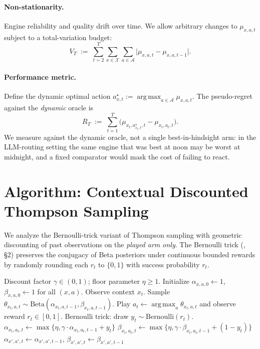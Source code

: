 \documentclass[11pt]{article}
\theoremstyle{definition}
\newcommand{\Beta}{\mathrm{Beta}}
\newcommand{\Bern}{\mathrm{Bernoulli}}
\DeclareMathOperator*{\argmax}{arg\,max}
\begin{document}
\paragraph{Non-stationarity.}
Engine reliability and quality drift over time. We allow arbitrary changes
to $\mu_{x,a,t}$ subject to a total-variation budget:
\begin{equation}
V_T \;:=\; \sum_{t=2}^{T} \sum_{x \in \mathcal{X}} \sum_{a \in \mathcal{A}} \big|\mu_{x,a,t} - \mu_{x,a,t-1}\big|.
\label{eq:variation-budget}
\end{equation}

\paragraph{Performance metric.}
Define the dynamic optimal action
$a^\star_{x,t} := \argmax_{a \in \mathcal{A}} \mu_{x,a,t}$. The pseudo-regret
against the \emph{dynamic} oracle is
\begin{equation}
R_T \;:=\; \sum_{t=1}^{T} \big(\mu_{x_t, a^\star_{x_t, t}, t} - \mu_{x_t, a_t, t}\big).
\label{eq:regret-def}
\end{equation}
We measure against the dynamic oracle, not a single best-in-hindsight arm:
in the LLM-routing setting the same engine that was best at noon may be
worst at midnight, and a fixed comparator would mask the cost of failing to
react.

\section{Algorithm: Contextual Discounted Thompson Sampling}
\label{sec:algorithm}

We analyze the Bernoulli-trick variant of Thompson sampling with geometric
discounting of past observations on the \emph{played arm only}. The
Bernoulli trick (\cite{agrawal2012analysis}, \S2) preserves the conjugacy
of Beta posteriors under continuous bounded rewards by randomly rounding
each $r_t$ to $\{0,1\}$ with success probability $r_t$.

\begin{algorithm}[h]
\caption{Contextual Discounted Thompson Sampling (CD-TS)}
\label{alg:cd-ts}
\begin{algorithmic}[1]
\Require Discount factor $\gamma \in (0,1)$; floor parameter $\eta \geq 1$.
\State Initialize $\alpha_{x,a,0} \gets 1$, $\beta_{x,a,0} \gets 1$ for all $(x,a)$.
    \State Observe context $x_t$.
        \State Sample $\theta_{x_t,a,t} \sim \Beta(\alpha_{x_t,a,t-1}, \beta_{x_t,a,t-1})$.
    \EndFor
    \State Play $a_t \gets \argmax_a \theta_{x_t,a,t}$ and observe reward $r_t \in [0,1]$.
    \State Bernoulli trick: draw $y_t \sim \Bern(r_t)$.
    \State $\alpha_{x_t,a_t,t} \gets \max\{\eta, \gamma \cdot \alpha_{x_t,a_t,t-1} + y_t\}$
    \State $\beta_{x_t,a_t,t} \gets \max\{\eta, \gamma \cdot \beta_{x_t,a_t,t-1} + (1-y_t)\}$
        \State $\alpha_{x',a',t} \gets \alpha_{x',a',t-1}$, $\beta_{x',a',t} \gets \beta_{x',a',t-1}$
    \EndFor
\EndFor
\end{algorithmic}
\end{algorithm}
\end{document}
